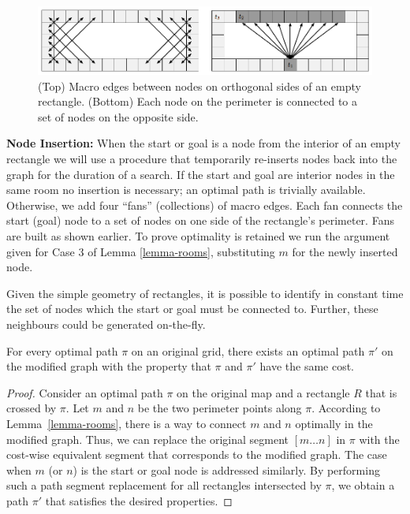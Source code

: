 \begin{figure}[tb]
       \begin{center}
		   \includegraphics[width=0.97\columnwidth, trim = 10mm 10mm 10mm 0mm]
			{diagrams/macroedges_wide.png}
       \end{center}
	\vspace{-3pt}
       \caption{(Top) Macro edges between nodes on orthogonal sides of an empty
       rectangle. (Bottom) Each node on the perimeter is connected to a set of 
		nodes on the opposite side.}
       \label{fig-macroedges}
\end{figure}

\noindent
\textbf{Node Insertion:}
When the start or goal is a node from the interior of an empty rectangle we
will use a procedure that temporarily re-inserts nodes back into the 
graph for the duration of a search.
{If the start and goal are interior nodes
in the same room no insertion is necessary; an optimal path is trivially
available. } {Otherwise, we add four ``fans'' (collections) of macro edges.  Each fan connects
the start (goal) node to a set of nodes on one side of the rectangle's
perimeter.  Fans are built as shown earlier.}
To prove optimality is retained we run the argument given
for Case 3 of Lemma \ref{lemma-rooms}, substituting $m$ for the newly inserted node.
\par
Given the simple geometry of rectangles, it is possible to identify in constant
time the set of nodes which the start or goal must be connected to.  Further,
these neighbours could be generated on-the-fly.

\begin{theorem}
For every optimal path $\pi$ on an original grid, there exists an optimal path
$\pi'$ on the modified graph with the property that $\pi$ and $\pi'$ have the
same cost.
\end{theorem}
\begin{proof}
Consider an optimal path $\pi$ on the original map and a rectangle $R$ that is
crossed by $\pi$.  Let $m$ and $n$ be the two perimeter points along $\pi$.
According to Lemma~\ref{lemma-rooms}, there is a way to connect $m$ and $n$
optimally in the modified graph. Thus, we can replace the original segment $[m
\dots n]$ in $\pi$ with the cost-wise equivalent segment that corresponds to the
modified graph.  The case when $m$ (or $n$) is the start or goal node is
addressed similarly.  By performing such a
path segment replacement for all rectangles intersected by $\pi$, we obtain a
path $\pi'$ that satisfies the desired properties.
\end{proof}


